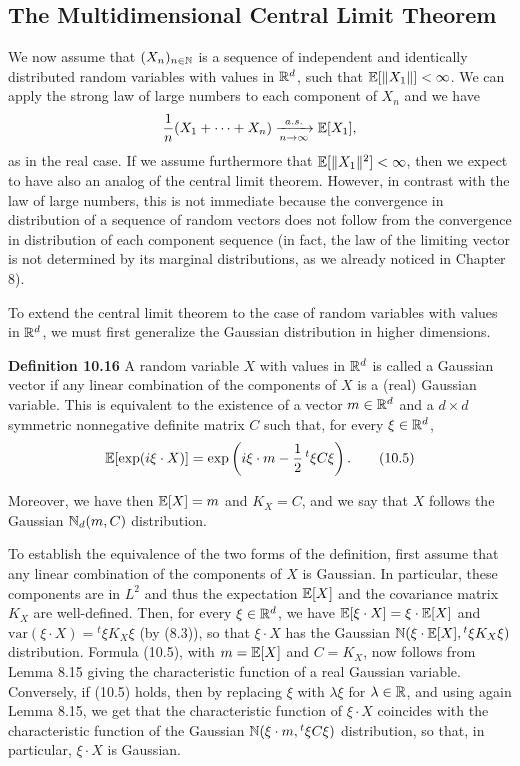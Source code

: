 \documentclass[../Main.tex]{subfiles}
\begin{document}
\subsection{The Multidimensional Central Limit Theorem}
We now assume that $(X_n)_{n \in \mathbb{N}}$ is a sequence of independent and identically distributed random variables with values in $\mathbb{R}^d$, such that $\mathbb{E}[\|X_1\|] < \infty$. We can apply the strong law of large numbers to each component of $X_n$ and we have
\[
\frac{1}{n}(X_1 + \cdots + X_n) \xrightarrow[n \to \infty]{a.s.} \mathbb{E}[X_1],
\]
as in the real case. If we assume furthermore that $\mathbb{E}[\|X_1\|^2] < \infty$, then we expect to have also an analog of the central limit theorem. However, in contrast with the law of large numbers, this is not immediate because the convergence in distribution of a sequence of random vectors does not follow from the convergence in distribution of each component sequence (in fact, the law of the limiting vector is not determined by its marginal distributions, as we already noticed in Chapter 8).

To extend the central limit theorem to the case of random variables with values in $\mathbb{R}^d$, we must first generalize the Gaussian distribution in higher dimensions.

\textbf{Definition 10.16} A random variable $X$ with values in $\mathbb{R}^d$ is called a Gaussian vector if any linear combination of the components of $X$ is a (real) Gaussian variable. This is equivalent to the existence of a vector $m \in \mathbb{R}^d$ and a $d \times d$ symmetric nonnegative definite matrix $C$ such that, for every $\xi \in \mathbb{R}^d$,
\[
\mathbb{E}[\exp(i \xi \cdot X)] = \exp\left(i \xi \cdot m - \frac{1}{2}\,{}^t\xi C \xi \right).
\tag{10.5}
\]

Moreover, we have then $\mathbb{E}[X] = m$ and $K_X = C$, and we say that $X$ follows the Gaussian $\mathbb{N}_d(m,C)$ distribution.

To establish the equivalence of the two forms of the definition, first assume that any linear combination of the components of $X$ is Gaussian. In particular, these components are in $L^2$ and thus the expectation $\mathbb{E}[X]$ and the covariance matrix $K_X$ are well-defined. Then, for every $\xi \in \mathbb{R}^d$, we have $\mathbb{E}[\xi \cdot X] = \xi \cdot \mathbb{E}[X]$ and $\mathrm{var}(\xi \cdot X) = {}^t\xi K_X \xi$ (by (8.3)), so that $\xi \cdot X$ has the Gaussian $\mathbb{N}(\xi \cdot \mathbb{E}[X], {}^t\xi K_X \xi)$ distribution. Formula (10.5), with $m = \mathbb{E}[X]$ and $C = K_X$, now follows from Lemma 8.15 giving the characteristic function of a real Gaussian variable. Conversely, if (10.5) holds, then by replacing $\xi$ with $\lambda \xi$ for $\lambda \in \mathbb{R}$, and using again Lemma 8.15, we get that the characteristic function of $\xi \cdot X$ coincides with the characteristic function of the Gaussian $\mathbb{N}(\xi \cdot m, {}^t\xi C \xi)$ distribution, so that, in particular, $\xi \cdot X$ is Gaussian.
\end{document}
